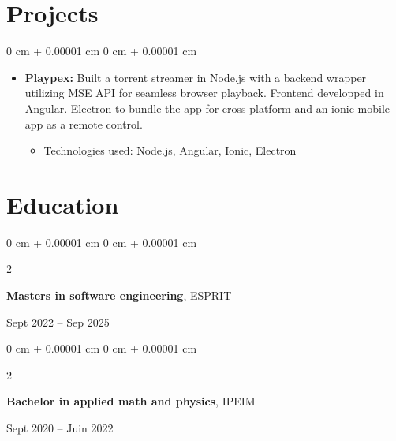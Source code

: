 \documentclass[10pt, letterpaper]{article}
\newenvironment{highlights}{
  \begin{itemize}[
    topsep=0.10 cm,
    parsep=0.10 cm,
    partopsep=0pt,
    itemsep=0pt,
    leftmargin=0 cm + 10pt
    ]
  }{
\end{itemize}
}
\newenvironment{highlightsforbulletentries}{
  \begin{itemize}[
    topsep=0.10 cm,
    parsep=0.10 cm,
    partopsep=0pt,
    itemsep=0pt,
    leftmargin=10pt
    ]
  }{
\end{itemize}
} %
\newenvironment{onecolentry}{
  \begin{adjustwidth}{
      0 cm + 0.00001 cm
    }{
      0 cm + 0.00001 cm
    }
  }{
  \end{adjustwidth}
} %
\newenvironment{twocolentry}[2][]{
  \onecolentry
  \def\secondColumn{#2}
  \setcolumnwidth{\fill, 4.5 cm}
  \begin{paracol}{2}
  }{
    \switchcolumn \raggedleft \secondColumn
  \end{paracol}
  \end{onecolentry}
} %
\begin{document}

  \section{Projects}

  \vspace{0.2 cm}



  \vspace{0.10 cm}
  \begin{onecolentry}
    \begin{highlights}
    \item \textbf{Playpex: } Built a torrent streamer in Node.js with a backend wrapper utilizing MSE API for seamless browser playback. Frontend developped in Angular. Electron to bundle the app for cross-platform and an ionic mobile app as a remote control.

                \begin{highlightsforbulletentries}
    \item Technologies used: Node.js, Angular, Ionic, Electron
    \end{highlightsforbulletentries}

    \end{highlights}
  \end{onecolentry}
  \vspace{0.2 cm}




  \section{Education}




  \begin{twocolentry}{
      Sept 2022 – Sep 2025
    }
    \textbf{Masters in software engineering}, ESPRIT
  \end{twocolentry}

  \vspace{0.10 cm}

  \begin{twocolentry}{
      Sept 2020 – Juin 2022
    }
    \textbf{Bachelor in applied math and physics}, IPEIM
  \end{twocolentry}




  
\end{document}
